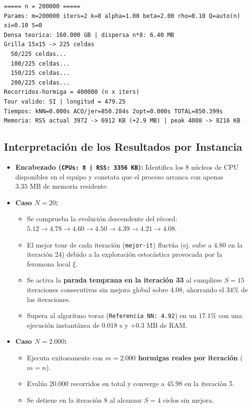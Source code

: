 \documentclass[11pt,a4paper]{article}
\begin{document}
\begin{lstlisting}
===== n = 200000 =====
Params: m=200000 iters=2 k=8 alpha=1.00 beta=2.00 rho=0.10 Q=auto(n) xi=0.10 S=0
Densa teorica: 160.000 GB | dispersa n*8: 6.40 MB
Grilla 15x15 -> 225 celdas
  50/225 celdas...
  100/225 celdas...
  150/225 celdas...
  200/225 celdas...
Recorridos-hormiga = 400000 (n x iters)
Tour valido: SI | longitud = 479.25
Tiempos: kNN=0.000s ACO/jer=850.284s 2opt=0.000s TOTAL=850.399s
Memoria: RSS actual 3972 -> 6912 KB (+2.9 MB) | peak 4008 -> 8216 KB
\end{lstlisting}

\subsection{Interpretación de los Resultados por Instancia}
\begin{itemize}
    \item \textbf{Encabezado (\texttt{CPUs: 8 | RSS: 3356 KB}):} Identifica los 8 núcleos de CPU disponibles en el equipo y constata que el proceso arranca con apenas $3.35\text{ MB}$ de memoria residente.
    \item \textbf{Caso $N=20$:}
    \begin{itemize}
        \item Se comprueba la evolución descendente del récord: $5.12 \to 4.78 \to 4.60 \to 4.50 \to 4.39 \to 4.21 \to 4.08$.
        \item El mejor tour de cada iteración (\texttt{mejor-it}) fluctúa (ej. sube a $4.80$ en la iteración 24) debido a la exploración estocástica provocada por la feromona local $\xi$.
        \item Se activa la \textbf{parada temprana en la iteración 33} al cumplirse $S=15$ iteraciones consecutivas sin mejora global sobre $4.08$, ahorrando el $34\%$ de las iteraciones.
        \item Supera al algoritmo voraz (\texttt{Referencia NN: 4.92}) en un $17.1\%$ con una ejecución instantánea de $0.018\text{ s}$ y $+0.3\text{ MB}$ de RAM.
    \end{itemize}
    \item \textbf{Caso $N=2.000$:}
    \begin{itemize}
        \item Ejecuta exitosamente con \textbf{$m = 2.000$ hormigas reales por iteración} ($m=n$).
        \item Evalúa $20.000$ recorridos en total y converge a $45.98$ en la iteración 5.
        \item Se detiene en la iteración 8 al alcanzar $S=4$ ciclos sin mejora.

\end{itemize}
\end{itemize}
\end{document}
